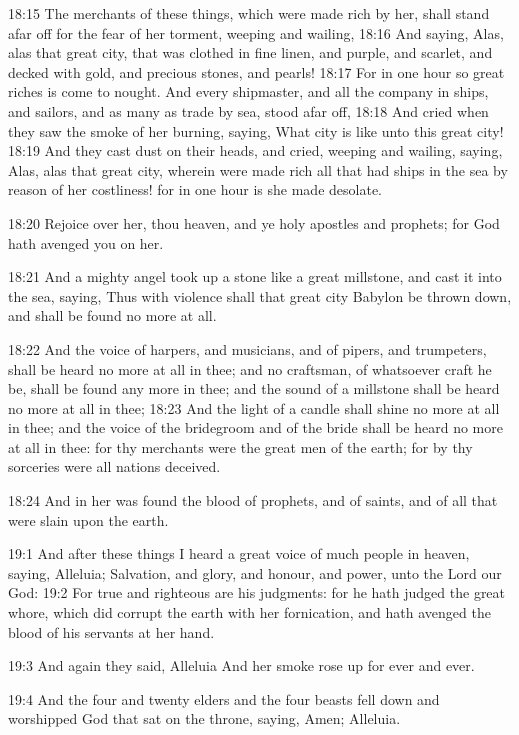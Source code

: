 18:15 The merchants of these things, which were made rich by her,
shall stand afar off for the fear of her torment, weeping and wailing,
18:16 And saying, Alas, alas that great city, that was clothed in fine
linen, and purple, and scarlet, and decked with gold, and precious
stones, and pearls!  18:17 For in one hour so great riches is come to
nought. And every shipmaster, and all the company in ships, and
sailors, and as many as trade by sea, stood afar off, 18:18 And cried
when they saw the smoke of her burning, saying, What city is like unto
this great city!  18:19 And they cast dust on their heads, and cried,
weeping and wailing, saying, Alas, alas that great city, wherein were
made rich all that had ships in the sea by reason of her costliness!
for in one hour is she made desolate.

18:20 Rejoice over her, thou heaven, and ye holy apostles and
prophets; for God hath avenged you on her.

18:21 And a mighty angel took up a stone like a great millstone, and
cast it into the sea, saying, Thus with violence shall that great city
Babylon be thrown down, and shall be found no more at all.

18:22 And the voice of harpers, and musicians, and of pipers, and
trumpeters, shall be heard no more at all in thee; and no craftsman,
of whatsoever craft he be, shall be found any more in thee; and the
sound of a millstone shall be heard no more at all in thee; 18:23 And
the light of a candle shall shine no more at all in thee; and the
voice of the bridegroom and of the bride shall be heard no more at all
in thee: for thy merchants were the great men of the earth; for by thy
sorceries were all nations deceived.

18:24 And in her was found the blood of prophets, and of saints, and
of all that were slain upon the earth.

19:1 And after these things I heard a great voice of much people in
heaven, saying, Alleluia; Salvation, and glory, and honour, and power,
unto the Lord our God: 19:2 For true and righteous are his judgments:
for he hath judged the great whore, which did corrupt the earth with
her fornication, and hath avenged the blood of his servants at her
hand.

19:3 And again they said, Alleluia And her smoke rose up for ever and
ever.

19:4 And the four and twenty elders and the four beasts fell down and
worshipped God that sat on the throne, saying, Amen; Alleluia.

